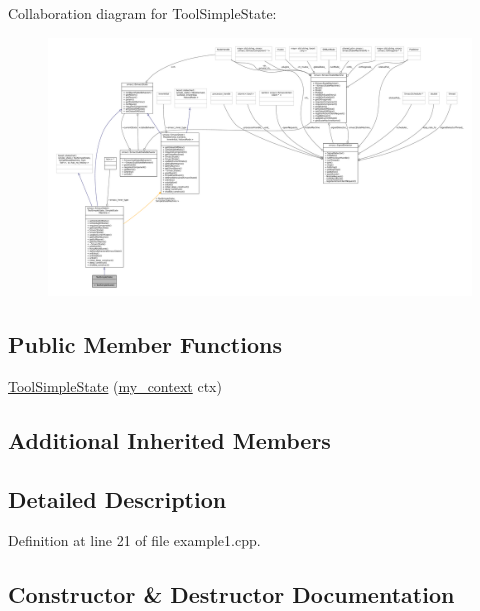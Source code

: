 Collaboration diagram for Tool\+Simple\+State\+:
\nopagebreak
\begin{figure}[H]
\begin{center}
\leavevmode
\includegraphics[width=350pt]{structToolSimpleState__coll__graph}
\end{center}
\end{figure}
\subsection*{Public Member Functions}
\begin{DoxyCompactItemize}
\item 
\hyperlink{structToolSimpleState_ab0f536d737c106d723a9a40129cc7cb1}{Tool\+Simple\+State} (\hyperlink{common_8h_af2dcacead80d69b96952496fe413bbfe}{my\+\_\+context} ctx)
\end{DoxyCompactItemize}
\subsection*{Additional Inherited Members}


\subsection{Detailed Description}


Definition at line 21 of file example1.\+cpp.



\subsection{Constructor \& Destructor Documentation}
